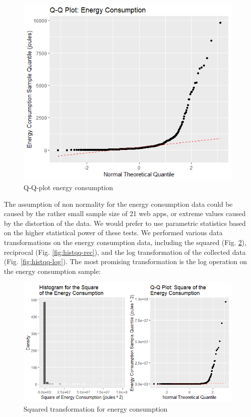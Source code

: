 \begin{figure}[H]
  \includegraphics[width=\linewidth]{./NewImages/Fig_7_QQPLOT_RAW.png}
  \caption{Q-Q-plot energy consumption}
  \label{fig:qqec}
\end{figure}

The assumption of non normality for the energy consumption data could be caused by the rather small sample size of 21 web apps, or extreme values caused by the distortion of the data. We would prefer to use parametric statistics based on the higher statistical power of these tests. We performed various data transformations on the energy consumption data, including the squared (Fig. \ref{fig:histqq-sqr}), reciprocal (Fig. \ref{fig:histqq-rec}), and the log transformation of the collected data (Fig. \ref{fig:histqq-log}). The most promising transformation is the log operation on the energy consumption sample:

\begin{figure}[H]
  \includegraphics[width=\linewidth]{./NewImages/Fig_8_Squared_Transform.png}
  \caption{Squared transformation for energy consumption}
  \label{fig:histqq-sqr}
\end{figure}

